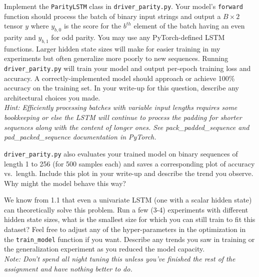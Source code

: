 \documentclass[a4paper,10pt]{article}
\begin{document}
\vspace{5pt}
\begin{taskbox}
 Implement the \texttt{ParityLSTM} class in \texttt{driver\_parity.py}. Your model's \texttt{forward} function should process the batch of binary input strings and output a $B \times 2$ tensor $y$ where $y_{b,0}$ is the score for the $b^{th}$ element of the batch having an even parity and $y_{b,1}$ for odd parity. You may use any PyTorch-defined LSTM functions. Larger hidden state sizes will make for easier training in my experiments but often generalize more poorly to new sequences. Running \texttt{driver\_parity.py} will train your model and output per-epoch training loss and accuracy. A correctly-implemented model should approach or achieve 100\% accuracy on the training set. In your write-up for this question, describe any architectural choices you made.\\[5pt]

\emph{Hint: Efficiently processing batches with variable input lengths requires some bookkeeping or else the LSTM will continue to process the padding for shorter sequences along with the content of longer ones. See pack\_padded\_sequence and pad\_packed\_sequence documentation in PyTorch.}
\end{taskbox}
\vspace{5pt}


\vspace{5pt}
\begin{taskbox}
 \texttt{driver\_parity.py} also evaluates your trained model on binary sequences of length 1 to 256 (for 500 samples each) and saves a corresponding plot of accuracy vs.~length. Include this plot in your write-up and describe the trend you observe. Why might the model behave this way?
\end{taskbox}
\vspace{5pt}

\vspace{5pt}
\begin{taskbox}
 We know from 1.1 that even a univariate LSTM (one with a scalar hidden state) can theoretically solve this problem. Run a few (3-4) experiments with different hidden state sizes, what is the smallest size for which you can still train to fit this dataset? Feel free to adjust any of the hyper-parameters in the optimization in the \texttt{train\_model} function if you want. Describe any trends you saw in training or the generalization experiment as you reduced the model capacity.\\[5pt]

\emph{Note: Don't spend all night tuning this unless you've finished the rest of the assignment and have nothing better to do.}
\end{taskbox}
\vspace{5pt}
\end{document}
